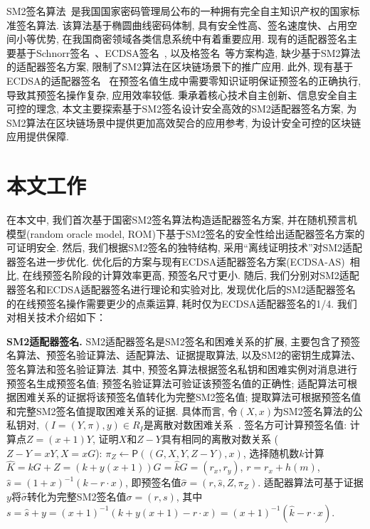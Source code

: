 \documentclass[review]{jcr}
\begin{document}
SM2签名算法~\cite{SM2,SM2-survey}是我国国家密码管理局公布的一种拥有完全自主知识产权的国家标准签名算法. 该算法基于椭圆曲线密码体制, 具有安全性高、签名速度快、占用空间小等优势, 在我国商密领域各类信息系统中有着重要应用. 现有的适配器签名主要基于Schnorr签名~\cite{Sch89,Poelstra2016,AumayrEEFHMMR20,ErwigFHMR2021}、ECDSA签名~\cite{ECDSA,rfc6605,AumayrEEFHMMR20,PA18}, 以及格签名~\cite{DucasLLSSS2018,EsginEE20}等方案构造, 缺少基于SM2算法的适配器签名方案, 限制了SM2算法在区块链场景下的推广应用. 此外, 现有基于ECDSA的适配器签名~\cite{AumayrEEFHMMR20} 在预签名值生成中需要零知识证明保证预签名的正确执行, 导致其预签名操作复杂, 应用效率较低. 秉承着核心技术自主创新、信息安全自主可控的理念, 本文主要探索基于SM2签名设计安全高效的SM2适配器签名方案, 为SM2算法在区块链场景中提供更加高效契合的应用参考, 为设计安全可控的区块链应用提供保障. 


\section{本文工作}  

在本文中, 我们首次基于国密SM2签名算法构造适配器签名方案, 并在随机预言机模型(random oracle model, ROM)下基于SM2签名的安全性给出适配器签名方案的可证明安全. 然后, 我们根据SM2签名的独特结构, 采用``离线证明技术''对SM2适配器签名进一步优化. 优化后的方案与现有ECDSA适配器签名方案(ECDSA-AS)~\cite{AumayrEEFHMMR20}相比, 在线预签名阶段的计算效率更高, 预签名尺寸更小. 随后, 我们分别对SM2适配器签名和ECDSA适配器签名进行理论和实验对比, 发现优化后的SM2适配器签名的在线预签名操作需要更少的点乘运算, 耗时仅为ECDSA适配器签名的1/4. 我们对相关技术介绍如下：

\begin{trivlist}
\item \textbf{SM2适配器签名.} SM2适配器签名是SM2签名和困难关系的扩展, 主要包含了预签名算法、预签名验证算法、适配算法、证据提取算法, 以及SM2的密钥生成算法、签名算法和签名验证算法. 其中, 预签名算法根据签名私钥和困难实例对消息进行预签名生成预签名值; 预签名验证算法可验证该预签名值的正确性; 适配算法可根据困难关系的证据将该预签名值转化为完整SM2签名值; 提取算法可根据预签名值和完整SM2签名值提取困难关系的证据. 具体而言, 令$(X,x)$为SM2签名算法的公私钥对, $(I=(Y,\pi),y)\in R_I$是离散对数困难关系~\cite{AumayrEEFHMMR20}. 签名方可计算预签名值: 计算点$Z=(x+1)Y$, 证明$X$和$Z-Y$具有相同的离散对数关系 ($Z-Y=xY, X=xG$): $\pi_Z\leftarrow \mathsf{P}((G,X,Y,Z-Y),x)$, 选择随机数$k$计算$\hat{K}=kG+Z=(k+y(x+1))G=\hat{k}G=(r_x,r_y)$, $r=r_x+h(m)$, $\hat{s}=(1+x)^{-1}(k-r\cdot x)$, 即预签名值$\hat{\sigma}=(r,\hat{s},Z,\pi_Z)$. 适配器算法可基于证据$y$将$\hat{\sigma}$转化为完整SM2签名值$\sigma=(r,s)$, 其中$s=\hat{s}+y=(x+1)^{-1}(k+y(x+1)-r\cdot x)=(x+1)^{-1}(\hat{k}-r\cdot x)$. 
\end{trivlist}
\end{document}
